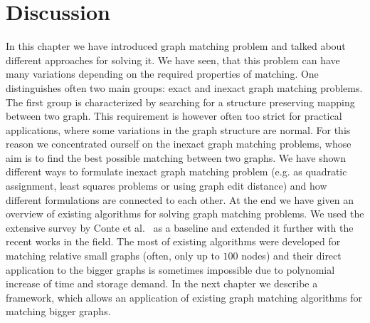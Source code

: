 
\section{Discussion}
In this chapter we have introduced graph matching problem and talked about different approaches for solving it. We have seen, that this problem can have many variations depending on the required properties of matching. One distinguishes often two main groups: exact and inexact graph matching problems. The first group is characterized by searching for a structure preserving mapping between two graph. This requirement is however often too strict for practical applications, where some variations in the graph structure are normal. For this reason we concentrated ourself on the inexact graph matching problems, whose aim is to find the best possible matching between two graphs. We have shown different ways to formulate inexact graph matching problem (e.g. as quadratic assignment, least squares problems or using graph edit distance) and how different formulations are connected to each other. At the end we have given an overview of existing algorithms for solving graph matching problems. We used the extensive survey by Conte et al.~\cite{Conte2004} as a baseline and extended it further with the recent works in the field. The most of existing algorithms were developed for matching relative small graphs (often, only up to $100$ nodes) and their direct application to the bigger graphs is sometimes impossible due to polynomial increase of time and storage demand. %
In the next chapter we describe a framework, which allows an application of existing graph matching algorithms for matching bigger graphs.
